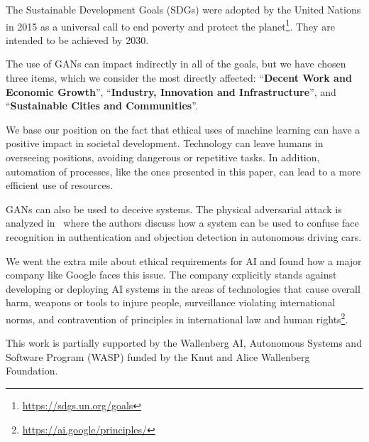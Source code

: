 \documentclass[12pt]{article}
\begin{document}
    The Sustainable Development Goals (SDGs) were adopted by the United Nations in 2015 as a universal call to end poverty and protect the planet\footnote{\url{https://sdgs.un.org/goals}}. They are intended to be achieved by 2030.

    The use of GANs can impact indirectly in all of the goals, but we have chosen three items, which we consider the most directly affected:
    ``\textbf{Decent Work and Economic Growth}'', ``\textbf{Industry, Innovation and Infrastructure}'', and
    ``\textbf{Sustainable Cities and Communities}''.

    We base our position on the fact that ethical uses of machine learning can have a positive impact in societal development.
    Technology can leave humans in overseeing positions, avoiding dangerous or repetitive tasks.
    In addition, automation of processes, like the ones presented in this paper, can lead to a more efficient use of resources.

    GANs can also be used to deceive systems.
    The physical adversarial attack is analyzed in~\cite{arxiv:1812.10217} where the authors discuss how a system can be used to confuse face recognition in authentication and objection detection in autonomous driving cars.

    We went the extra mile about ethical requirements for AI and found how a major company like Google faces this issue.
    The company explicitly stands against developing or deploying AI systems in the areas of technologies that cause overall harm, weapons or tools to injure people, surveillance violating international norms, and contravention of principles in international law and human rights\footnote{\url{https://ai.google/principles/}}.

    \begin{ack}
        This work is partially supported by the Wallenberg AI, Autonomous Systems and Software Program (WASP) funded by the Knut and Alice Wallenberg Foundation.
    \end{ack}

    

    
\end{document}
